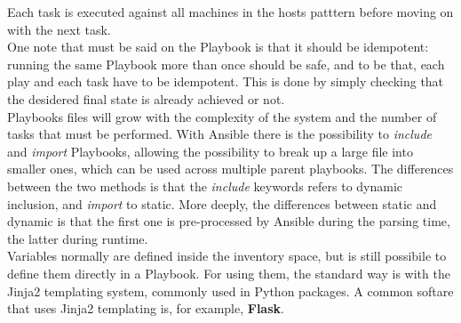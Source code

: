\documentclass[conference]{IEEEtran}
\begin{document}
Each task is executed against all machines in the hosts patttern before moving on with the next task. \\
One note that must be said on the Playbook is that it should be idempotent: running the same Playbook more than once should be safe, and to be that, each play and each task have to be idempotent. This is done by simply checking that the desidered final state is already achieved or not.\\
Playbooks files will grow with the complexity of the system and the number of tasks that must be performed. With Ansible there is the possibility to \textit{include} and \textit{import} Playbooks, allowing the possibility to break up a large file into smaller ones, which can be used across multiple parent playbooks. The differences between the two methods is that the \textit{include} keywords refers to dynamic inclusion, and \textit{import} to static. More deeply, the differences between static and dynamic is that the first one is pre-processed by Ansible during the parsing time, the latter during runtime.\\
Variables normally are defined inside the inventory space, but is still possibile to define them directly in a Playbook. For using them, the standard way is with the Jinja2 templating system, commonly used in Python packages. A common softare that uses Jinja2 templating is, for example, \textbf{Flask}.\\
\end{document}
